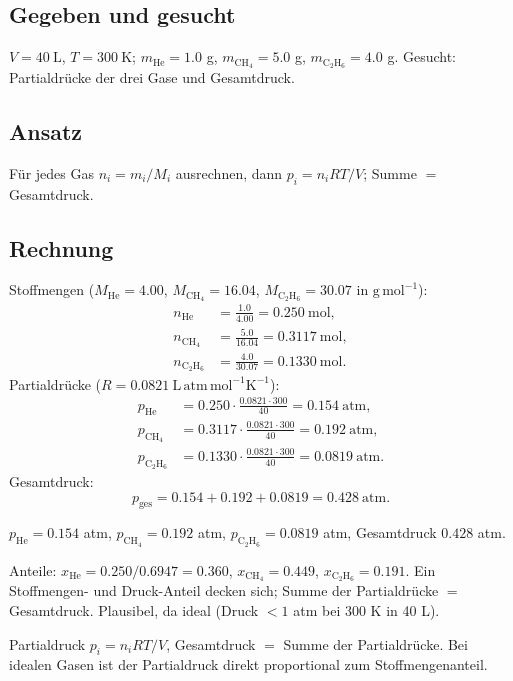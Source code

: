 
\subsection*{Gegeben und gesucht}
$V=40\ \mathrm{L}$, $T=300\ \mathrm{K}$; $m_{\mathrm{He}}=1.0$ g,
$m_{\mathrm{CH_4}}=5.0$ g, $m_{\mathrm{C_2H_6}}=4.0$ g. Gesucht:
Partialdr\"ucke der drei Gase und Gesamtdruck.

\subsection*{Ansatz}
F\"ur jedes Gas $n_i=m_i/M_i$ ausrechnen, dann $p_i=n_i RT/V$; Summe
$=$ Gesamtdruck.

\subsection*{Rechnung}
Stoffmengen ($M_{\mathrm{He}}=4.00$, $M_{\mathrm{CH_4}}=16.04$,
$M_{\mathrm{C_2H_6}}=30.07$ in $\mathrm{g\,mol^{-1}}$):
\begin{align*}
  n_{\mathrm{He}} &= \frac{1.0}{4.00} = 0.250\ \mathrm{mol},\\
  n_{\mathrm{CH_4}} &= \frac{5.0}{16.04} = 0.3117\ \mathrm{mol},\\
  n_{\mathrm{C_2H_6}} &= \frac{4.0}{30.07} = 0.1330\ \mathrm{mol}.
\end{align*}
Partialdr\"ucke ($R=0.0821\ \mathrm{L\,atm\,mol^{-1}K^{-1}}$):
\begin{align*}
  p_{\mathrm{He}} &= 0.250\cdot\frac{0.0821\cdot 300}{40}
                    = 0.154\ \mathrm{atm},\\
  p_{\mathrm{CH_4}} &= 0.3117\cdot\frac{0.0821\cdot 300}{40}
                    = 0.192\ \mathrm{atm},\\
  p_{\mathrm{C_2H_6}} &= 0.1330\cdot\frac{0.0821\cdot 300}{40}
                    = 0.0819\ \mathrm{atm}.
\end{align*}
Gesamtdruck:
\[
  p_{\text{ges}} = 0.154 + 0.192 + 0.0819 = 0.428\ \mathrm{atm}.
\]

\begin{ergebnis}
$p_{\mathrm{He}}=0.154$ atm, $p_{\mathrm{CH_4}}=0.192$ atm,
$p_{\mathrm{C_2H_6}}=0.0819$ atm, Gesamtdruck $0.428$ atm.
\end{ergebnis}

\begin{kontrolle}
Anteile: $x_{\mathrm{He}}=0.250/0.6947=0.360$,
$x_{\mathrm{CH_4}}=0.449$, $x_{\mathrm{C_2H_6}}=0.191$. Ein Stoffmengen-
und Druck-Anteil decken sich; Summe der Partialdr\"ucke $=$ Gesamtdruck.
Plausibel, da ideal (Druck $<1$ atm bei 300 K in 40 L).
\end{kontrolle}

\begin{merksatz}
Partialdruck $p_i = n_i RT/V$, Gesamtdruck $=$ Summe der
Partialdr\"ucke. Bei idealen Gasen ist der Partialdruck direkt proportional
zum Stoffmengenanteil.
\end{merksatz}
